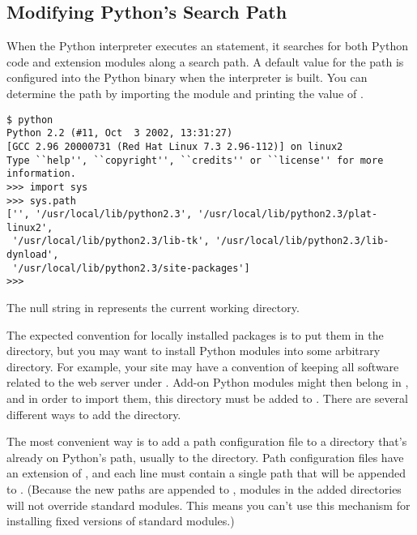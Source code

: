 \documentclass{howto}
\begin{document}


\subsection{Modifying Python's Search Path}
\label{search-path}

When the Python interpreter executes an  statement, it
searches for both Python code and extension modules along a search
path.  A default value for the path is configured into the Python
binary when the interpreter is built.  You can determine the path by
importing the  module and printing the value of
.  

\begin{verbatim}
$ python
Python 2.2 (#11, Oct  3 2002, 13:31:27)
[GCC 2.96 20000731 (Red Hat Linux 7.3 2.96-112)] on linux2
Type ``help'', ``copyright'', ``credits'' or ``license'' for more information.
>>> import sys
>>> sys.path
['', '/usr/local/lib/python2.3', '/usr/local/lib/python2.3/plat-linux2', 
 '/usr/local/lib/python2.3/lib-tk', '/usr/local/lib/python2.3/lib-dynload', 
 '/usr/local/lib/python2.3/site-packages']
>>>
\end{verbatim} %

The null string in  represents the current working
directory.   

The expected convention for locally installed packages is to put them
in the  directory, but you may want to
install Python modules into some arbitrary directory.  For example,
your site may have a convention of keeping all software related to the
web server under .  Add-on Python modules might then belong
in , and in order to import them, this directory
must be added to .  There are several different ways to
add the directory.

The most convenient way is to add a path configuration file to a
directory that's already on Python's path, usually to the
 directory.  Path configuration files have an
extension of , and each line must contain a single path
that will be appended to .  (Because the new paths are
appended to , modules in the added directories will not
override standard modules.  This means you can't use this mechanism
for installing fixed versions of standard modules.)
\end{document}
